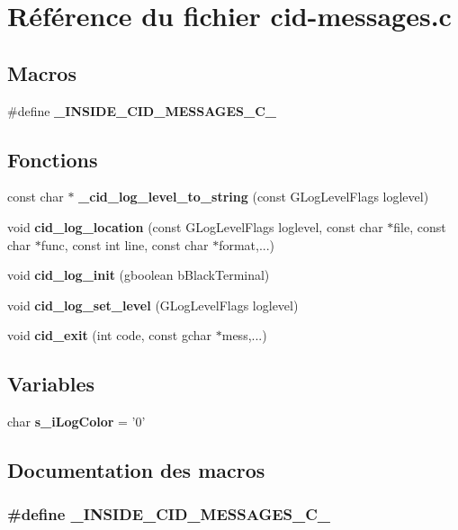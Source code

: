 \section{Référence du fichier cid-messages.c}
\label{cid-messages_8c}
\subsection*{Macros}
\begin{CompactItemize}
\item 
\#define {\bf \_\-INSIDE\_\-CID\_\-MESSAGES\_\-C\_\-}
\end{CompactItemize}
\subsection*{Fonctions}
\begin{CompactItemize}
\item 
const char $\ast$ {\bf \_\-cid\_\-log\_\-level\_\-to\_\-string} (const GLogLevelFlags loglevel)
\item 
void {\bf cid\_\-log\_\-location} (const GLogLevelFlags loglevel, const char $\ast$file, const char $\ast$func, const int line, const char $\ast$format,...)
\item 
void {\bf cid\_\-log\_\-init} (gboolean bBlackTerminal)
\item 
void {\bf cid\_\-log\_\-set\_\-level} (GLogLevelFlags loglevel)
\item 
void {\bf cid\_\-exit} (int code, const gchar $\ast$mess,...)
\end{CompactItemize}
\subsection*{Variables}
\begin{CompactItemize}
\item 
char {\bf s\_\-iLogColor} = '0'
\end{CompactItemize}


\subsection{Documentation des macros}
\subsubsection{\setlength{\rightskip}{0pt plus 5cm}\#define \_\-INSIDE\_\-CID\_\-MESSAGES\_\-C\_\-}\label{cid-messages_8c_7e31b219b6b8abedd57ef63975e18c2c}




